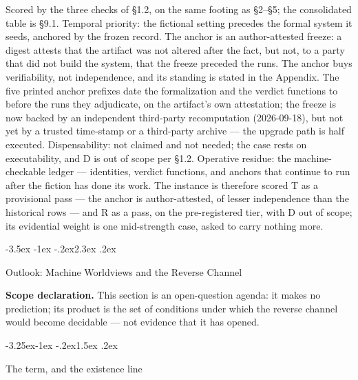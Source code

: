 \documentclass[11pt,a4paper]{article}
\makeatletter
\renewcommand\section{\@startsection{section}{1}{\z@}%
  {-3.5ex \@plus -1ex \@minus -.2ex}{2.3ex \@plus .2ex}%
  {\normalfont\Large\bfseries\raggedright}}
\renewcommand\subsection{\@startsection{subsection}{2}{\z@}%
  {-3.25ex\@plus -1ex \@minus -.2ex}{1.5ex \@plus .2ex}%
  {\normalfont\large\bfseries\raggedright}}
\makeatother
\begin{document}
Scored by the three checks of §1.2, on the same footing as §2–§5; the consolidated table is §9.1. Temporal priority: the fictional setting precedes the formal system it seeds, anchored by the frozen record. The anchor is an author-attested freeze: a digest attests that the artifact was not altered after the fact, but not, to a party that did not build the system, that the freeze preceded the runs. The anchor buys verifiability, not independence, and its standing is stated in the Appendix. The five printed anchor prefixes date the formalization and the verdict functions to before the runs they adjudicate, on the artifact's own attestation; the freeze is now backed by an independent third-party recomputation (2026-09-18), but not yet by a trusted time-stamp or a third-party archive — the upgrade path is half executed. Dispensability: not claimed and not needed; the case rests on executability, and D is out of scope per §1.2. Operative residue: the machine-checkable ledger — identities, verdict functions, and anchors that continue to run after the fiction has done its work. The instance is therefore scored T as a provisional pass — the anchor is author-attested, of lesser independence than the historical rows — and R as a pass, on the pre-registered tier, with D out of scope; its evidential weight is one mid-strength case, asked to carry nothing more.

\section{Outlook: Machine Worldviews and the Reverse Channel}

\textbf{Scope declaration.} This section is an open-question agenda: it makes no prediction; its product is the set of conditions under which the reverse channel would become decidable — not evidence that it has opened.

\subsection{The term, and the existence line}
\end{document}
